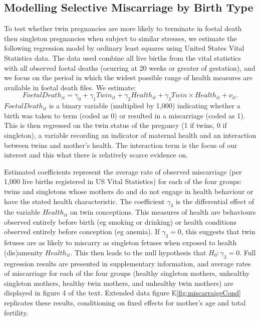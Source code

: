 \documentclass{nature}
\begin{document}
\begin{linenumbers}
\subsection{Modelling Selective Miscarriage by Birth Type}
To test whether twin  pregnancies are more likely to terminate in foetal death then singleton pregnancies when subject to similar stresses, we estimate the following regression model by ordinary least squares using United States Vital Statistics data.  The data used combine all live births from the vital statistics with all observed foetal deaths (ocurring at 20 weeks or greater of gestation), and we focus on the period in which the widest possible range of health measures are available in foetal death files.  We estimate:
\begin{equation}
FoetalDeath_{it} = \gamma_0 + \gamma_1 Twin_{it} + \gamma_2 Health_{it} + \gamma_3 Twin\times Health_{it} + \nu_{it}.
\end{equation}
$FoetalDeath_{it}$ is a binary variable (multiplied by 1,000) indicating whether a birth was taken to term (coded as 0) or resulted in a miscarriage (coded as 1). This is then regressed on the twin status of the pregancy (1 if twins, 0 if singleton), a variable recording an indicator of maternal health and an interaction between twins and mother's health. The interaction term is the focus of our interest and this what there is relatively scarce evidence on. 

Estimated coefficients represent the average rate of observed miscarriage (per 1,000 live births registered in US Vital Statistics) for each of the four groups: twins and singletons whose mothers do and do not engage in health behaviour or have the stated health characteristic. The coefficient $\gamma_3$ is the differential effect of the variable $Health_{it}$ on twin conceptions.  This measures of health are behaviours observed entirely before birth (eg smoking or drinking) or health conditions observed entirely before conception (eg anemia).  If $\gamma_3=0$, this suggests that twin fetuses are as likely to miscarry as singleton fetuses when exposed to health (dis)amenity $Health_{it}$.  This then leads to the null hypothesis that $H_0: \gamma_3=0$. Full regression results are presented in supplementary information, and average rates of miscarriage for each of the four groups (healthy singleton mothers, unhealthy singleton mothers, healthy twin mothers, and unhealthy twin mothers) are displayed in figure 4 of the text.  Extended data figure E\ref{fig:miscarraigeCond} replicates these results, conditioning on fixed effects for mother's age and total fertility.


\end{linenumbers}
\end{document}
